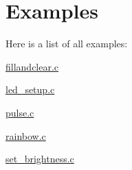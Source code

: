 \section{Examples}
Here is a list of all examples\-:\begin{DoxyCompactItemize}
\item 
\hyperlink{fillandclear_8c-example}{fillandclear.\-c}
\item 
\hyperlink{led_setup_8c-example}{led\-\_\-setup.\-c}
\item 
\hyperlink{pulse_8c-example}{pulse.\-c}
\item 
\hyperlink{rainbow_8c-example}{rainbow.\-c}
\item 
\hyperlink{set_brightness_8c-example}{set\-\_\-brightness.\-c}
\end{DoxyCompactItemize}
